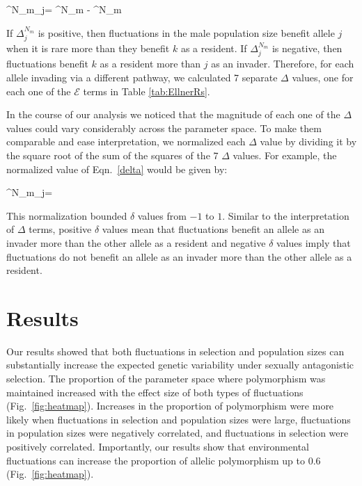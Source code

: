 \documentclass[12pt]{article}
\let\oldequation\equation
\let\oldendequation\endequation
\renewenvironment{equation}
  {\linenomathNonumbers\oldequation}
  {\oldendequation\endlinenomath}
\begin{document}
\begin{equation}
\Delta^{N_{m}}_{j}= ^{N_{m}} - ^{N_{m}}
\label{delta}
\end{equation}

If $\Delta^{N_{m}}_{j}$ is positive, then fluctuations in the male population size benefit allele $j$ when it is rare more than they benefit $k$ as a resident. If $\Delta^{N_{m}}_{j}$ is negative, then fluctuations benefit $k$ as a resident more than $j$ as an invader. Therefore, for each allele invading via a different pathway, we calculated 7 separate $\Delta$ values, one for each one of the $\mathcal{E}$ terms in Table \ref{tab:EllnerRs}.


In the course of our analysis we noticed that the magnitude of each one of the $\Delta$ values could vary considerably across the parameter space. To make them comparable and ease interpretation, we normalized each $\Delta$ value by dividing it by the square root of the sum of the squares of the 7 $\Delta$ values. For example, the normalized value of Eqn.~\ref{delta} would be given by:



\begin{equation}
  \delta^{N_{m}}_{j}= 
\end{equation}

This normalization bounded $\delta$ values from $-1$ to $1$. Similar to the interpretation of $\Delta$ terms, positive $\delta$ values mean that fluctuations benefit an allele as an invader more than the other allele as a resident and negative $\delta$ values imply that fluctuations do not benefit an allele as an invader more than the other allele as a resident.


\section{Results}
Our results showed that both fluctuations in selection and population sizes can substantially increase the expected genetic variability under sexually antagonistic selection. The proportion of the parameter space where polymorphism was maintained increased with the effect size of both types of fluctuations (Fig.~\ref{fig:heatmap}). Increases in the proportion of polymorphism were more likely when fluctuations in selection and population sizes were large, fluctuations in population sizes were negatively correlated, and fluctuations in selection were positively correlated. Importantly, our results show that environmental fluctuations can increase the proportion of allelic polymorphism up to $0.6$ (Fig.~\ref{fig:heatmap}).
\end{document}
